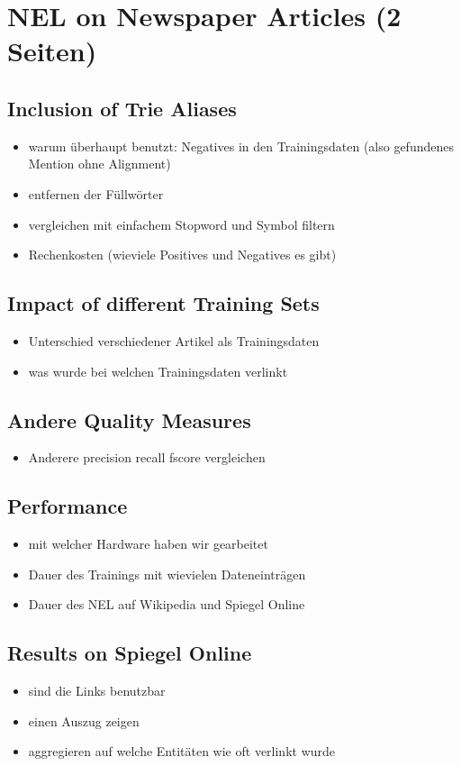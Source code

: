 \section{NEL on Newspaper Articles (2 Seiten)}
\label{sec:NELEval}
	\subsection{Inclusion of Trie Aliases}
	\begin{itemize}
		\item warum überhaupt benutzt: Negatives in den Trainingsdaten (also gefundenes Mention ohne Alignment)
		\item entfernen der Füllwörter
		\item vergleichen mit einfachem Stopword und Symbol filtern
		\item Rechenkosten (wieviele Positives und Negatives es gibt)
	\end{itemize}
	\subsection{Impact of different Training Sets}
	\begin{itemize}
		\item Unterschied verschiedener Artikel als Trainingsdaten
		\item was wurde bei welchen Trainingsdaten verlinkt
	\end{itemize}
	\subsection{Andere Quality Measures}
	\begin{itemize}
		\item Anderere precision recall fscore vergleichen
	\end{itemize}
	\subsection{Performance}
	\begin{itemize}
		\item mit welcher Hardware haben wir gearbeitet
		\item Dauer des Trainings mit wievielen Dateneinträgen
		\item Dauer des NEL auf Wikipedia und Spiegel Online
	\end{itemize}
	\subsection{Results on Spiegel Online}
	\begin{itemize}
		\item sind die Links benutzbar
		\item einen Auszug zeigen
		\item aggregieren auf welche Entitäten wie oft verlinkt wurde
	\end{itemize}
	